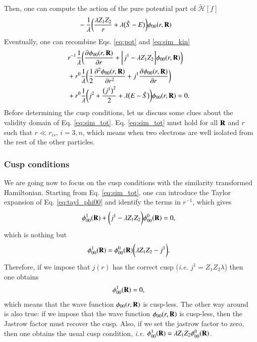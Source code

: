 \documentclass[aip,jcp,reprint,noshowkeys,superscriptaddress]{revtex4-1}
\newcommand{\deriv}[3]{\frac{\partial^{#3} #1}{\partial {#2}^{#3}}}
\newcommand{\bd}[1]{{\bf {#1}}}
\begin{document}
Then, one can compute the action of the pure potential part of $\tilde{\mathcal{H}}[f]$ 
\begin{equation}
 \label{eq:pot}
 \begin{aligned}
& - \frac{1}{\lambda}\bigg( \frac{\lambda Z_1 Z_2}{r}  + \lambda\big(\hat{S} -E\big) \bigg) \phi_{00}(r,\bd{R})  
 \end{aligned}
\end{equation}
Eventually, one can recombine Eqs. \eqref{eq:pot} and \eqref{eq:sim_kin} 
\begin{equation}
 \label{eq:sim_tot}
 \begin{aligned}
& r^{-1} \frac{1}{\lambda}\bigg( \deriv{\phi_{00}(r,\bd{R})}{r}{} + \bigg[j^1-\lambda Z_1 Z_2\bigg]\phi_{00}(r,\bd{R})\bigg)  \\
& + r^0 \frac{1}{\lambda} \bigg( \frac{1}{2}\deriv{\phi_{00}(r,\bd{R})}{r}{2} + j^1 \deriv{\phi_{00}(r,\bd{R})}{r}{}\bigg) \\
& + r^0 \frac{1}{\lambda} \bigg( j^2  + \frac{\big(j^1\big)^2}{2} + \lambda \big( E - \hat{S} \big) \bigg) \phi_{00}(r,\bd{R}) = 0.
 \end{aligned}
\end{equation}
Before determining the cusp conditions, let us discuss some clues about the validity domain of Eq. \eqref{eq:sim_tot}. 
Eq. \eqref{eq:sim_tot} must hold for all  $\bd{R}$ and $r$ such that $r\ll r_{is},\,i=3,n $, which means when two electrons are well isolated from the rest of the other particles. 

\subsubsection{Cusp conditions}
We are going now to focus on the cusp conditions with the similarity transformed Hamiltonian. 
Starting from Eq. \eqref{eq:sim_tot}, one can introduce the Taylor expansion of Eq. \eqref{eq:tayl_phi00} and identify the terms in $r^{-1}$, which gives 
\begin{equation}
 \begin{aligned}
  \phi_{00}^1(\bd{R}) +  \bigg( j^1 - \lambda Z_1 Z_2\bigg) \phi_{00}^0(\bd{R}) = 0, 
 \end{aligned}
\end{equation}
which is nothing but
\begin{equation}
 \phi_{00}^1(\bd{R}) = \phi_{00}^0(\bd{R}) \bigg( \lambda Z_1 Z_2 - j^1\bigg). 
\end{equation}
Therefore, if we impose that $j(r)$ has the correct cusp (\textit{i.e.} $j^1 = Z_1 Z_2 \lambda$) then one obtains 
\begin{equation}
 \phi_{00}^{1}(\bd{R}) = 0, 
\end{equation}
which means that the wave function $\phi_{00}(r,\bd{R})$ is cusp-less. The other way around is also true: if we impose that the wave function $\phi_{00}(r,\bd{R})$ is cusp-less, then the Jastrow factor must recover the cusp. 
Also, if we set the jastrow factor to zero, then one obtains the usual cusp condition, \textit{i.e.} $\phi_{00}^1(\bd{R}) = \lambda Z_1 Z_2 \phi_{00}^0(\bd{R}) $.
\end{document}
